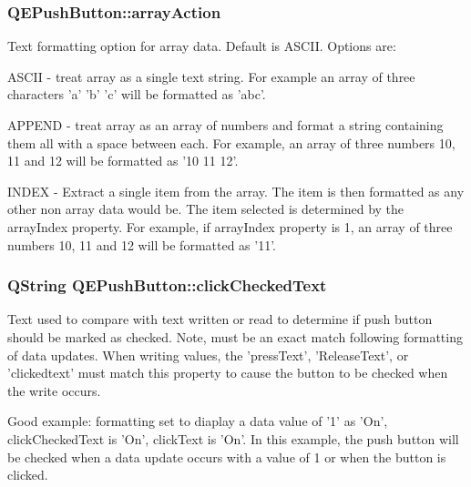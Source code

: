 \hypertarget{classQEPushButton_a4f7d3bd9238cfbb811ae4aa83bc499eb}{
\subsubsection[{arrayAction}]{ QEPushButton::arrayAction}}
\label{classQEPushButton_a4f7d3bd9238cfbb811ae4aa83bc499eb}
Text formatting option for array data. Default is ASCII. Options are: \begin{DoxyItemize}
\item ASCII -\/ treat array as a single text string. For example an array of three characters 'a' 'b' 'c' will be formatted as 'abc'. \item APPEND -\/ treat array as an array of numbers and format a string containing them all with a space between each. For example, an array of three numbers 10, 11 and 12 will be formatted as '10 11 12'. \item INDEX -\/ Extract a single item from the array. The item is then formatted as any other non array data would be. The item selected is determined by the arrayIndex property. For example, if arrayIndex property is 1, an array of three numbers 10, 11 and 12 will be formatted as '11'. \end{DoxyItemize}
\hypertarget{classQEPushButton_a6dfe1f7842d84c9b8ea19f43346be73f}{
\subsubsection[{clickCheckedText}]{\setlength{\rightskip}{0pt plus 5cm}QString QEPushButton::clickCheckedText}}
\label{classQEPushButton_a6dfe1f7842d84c9b8ea19f43346be73f}
Text used to compare with text written or read to determine if push button should be marked as checked. Note, must be an exact match following formatting of data updates. When writing values, the 'pressText', 'ReleaseText', or 'clickedtext' must match this property to cause the button to be checked when the write occurs.

Good example: formatting set to diaplay a data value of '1' as 'On', clickCheckedText is 'On', clickText is 'On'. In this example, the push button will be checked when a data update occurs with a value of 1 or when the button is clicked.

